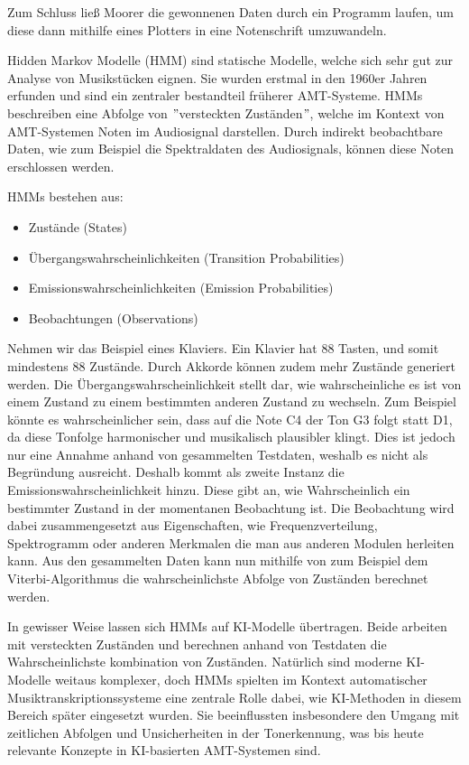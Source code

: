 Zum Schluss ließ Moorer die gewonnenen Daten durch ein Programm laufen, 
um diese dann mithilfe eines Plotters in eine Notenschrift umzuwandeln.

\begin{description}[style=nextline]
\item[Hidden Markov Modelle]\label{itm:hiddenMarkov}
Hidden Markov Modelle (HMM) sind statische Modelle, welche sich sehr gut zur Analyse von Musikstücken eignen.
Sie wurden erstmal in den 1960er Jahren erfunden
\cite{baum1970maximization}
und sind ein zentraler bestandteil früherer AMT-Systeme.
HMMs beschreiben eine Abfolge von \("\)versteckten Zuständen\("\),
welche im Kontext von AMT-Systemen Noten im Audiosignal darstellen.
Durch indirekt beobachtbare Daten, wie zum Beispiel die Spektraldaten des Audiosignals,
können diese Noten erschlossen werden.

HMMs bestehen aus:
\begin{itemize}
    \item Zustände (States)
    \item Übergangswahrscheinlichkeiten (Transition Probabilities)
    \item Emissionswahrscheinlichkeiten (Emission Probabilities)
    \item Beobachtungen (Observations)
\end{itemize}
Nehmen wir das Beispiel eines Klaviers.
Ein Klavier hat 88 Tasten, und somit mindestens 88 Zustände.
Durch Akkorde können zudem mehr Zustände generiert werden.
Die Übergangswahrscheinlichkeit stellt dar,
wie wahrscheinliche es ist von einem Zustand zu einem bestimmten anderen Zustand zu wechseln.
Zum Beispiel könnte es wahrscheinlicher sein, dass auf die Note C4 der Ton G3 folgt statt D1,
da diese Tonfolge harmonischer und musikalisch plausibler klingt.
Dies ist jedoch nur eine Annahme anhand von gesammelten Testdaten, weshalb es nicht als Begründung ausreicht.
Deshalb kommt als zweite Instanz die Emissionswahrscheinlichkeit hinzu.
Diese gibt an, wie Wahrscheinlich ein bestimmter Zustand in der momentanen Beobachtung ist.
Die Beobachtung wird dabei zusammengesetzt aus Eigenschaften, wie Frequenzverteilung, Spektrogramm
oder anderen Merkmalen die man aus anderen Modulen herleiten kann.
Aus den gesammelten Daten kann nun mithilfe von zum Beispiel dem Viterbi-Algorithmus
\cite{takeda2002hidden}
die wahrscheinlichste Abfolge von Zuständen berechnet werden.

In gewisser Weise lassen sich HMMs auf KI-Modelle übertragen.
Beide arbeiten mit versteckten Zuständen und
berechnen anhand von Testdaten die Wahrscheinlichste kombination von Zuständen.
Natürlich sind moderne KI-Modelle weitaus komplexer,
doch HMMs spielten im Kontext automatischer Musiktranskriptionssysteme eine zentrale Rolle dabei,
wie KI-Methoden in diesem Bereich später eingesetzt wurden.
Sie beeinflussten insbesondere den Umgang mit zeitlichen Abfolgen
und Unsicherheiten in der Tonerkennung,
was bis heute relevante Konzepte in KI-basierten AMT-Systemen sind.
\end{description}


